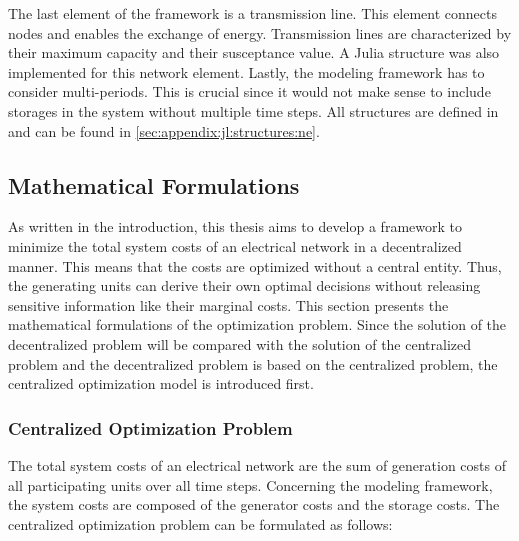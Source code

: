

The last element of the framework is a transmission line. This element connects nodes and enables the exchange of energy. Transmission lines are characterized by their maximum capacity and their susceptance value. A Julia structure was also implemented for this network element. Lastly, the modeling framework has to consider multi-periods. This is crucial since it would not make sense to include storages in the system without multiple time steps. All structures are defined in  and can be found in \ref{sec:appendix:jl:structures:ne}.


\subsection{Mathematical Formulations}
\label{sec:app:math-form}

As written in the introduction, this thesis aims to develop a framework to minimize the total system costs of an electrical network in a decentralized manner. This means that the costs are optimized without a central entity. Thus, the generating units can derive their own optimal decisions without releasing sensitive information like their marginal costs. This section presents the mathematical formulations of the optimization problem. Since the solution of the decentralized problem will be compared with the solution of the centralized problem and the decentralized problem is based on the centralized problem, the centralized optimization model is introduced first.

\subsubsection{Centralized Optimization Problem}

The total system costs of an electrical network are the sum of generation costs of all participating units over all time steps. Concerning the modeling framework, the system costs are composed of the generator costs and the storage costs. The centralized optimization problem can be formulated as follows:

